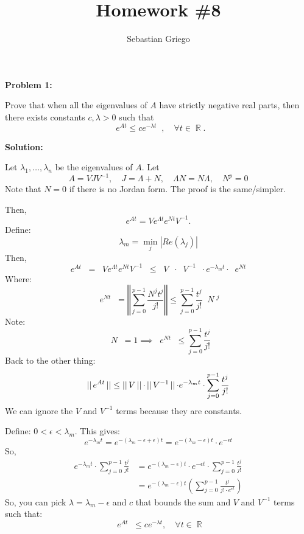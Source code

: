 \documentclass[12pt]{article}
\DeclareMathOperator{\norm}{||}
\DeclareMathOperator{\RR}{\mathbb{R}}
\newenvironment{problem}[1]{
    \textbf{Problem #1:}
}{
    \rmfamily \vspace{1em}
}
\newenvironment{solution}{
    \textbf{Solution:}
    
}{
    
    \vspace{2em}
}
\begin{document}
\title{Homework \#8}  %
\author{Sebastian Griego}  %
\maketitle


\begin{problem}{1}
    Prove that when all the eigenvalues of \(A\) have strictly negative real parts,
    then there exists constants \(c, \lambda > 0\) such that
    \[
        \norm{e^{At}} \leq c e^{-\lambda t} \norm, \quad \forall t \in \RR.
    \]
\end{problem}

\begin{solution}
    Let \(\lambda_1, \ldots, \lambda_n\) be the eigenvalues of \(A\). Let
    \[
        A = VJV^{-1}, \quad J = \Lambda + N, \quad \Lambda N = N\Lambda, \quad N^p=0
    \]
    Note that \(N = 0\) if there is no Jordan form. The proof is the same/simpler.

    Then,
    \[
        e^{At} = V e^{\Lambda t}e^{Nt} V^{-1}.
    \]
    Define:
    \[
        \lambda_m = \min_j |Re(\lambda_j)|
    \]
    Then,
    \[
        \norm{e^{At}}\norm = \norm{V e^{\Lambda t}e^{Nt} V^{-1}}\norm \leq \norm{V}\norm \cdot \norm V^{-1}\norm \cdot e^{-\lambda_m t} \cdot \norm{e^{Nt}}\norm
    \]
    Where:
    \[
        \norm{e^{Nt}}\norm = \left\Vert \sum_{j=0}^{p-1} \frac{N^j t^j}{j!} \right\Vert \leq \sum_{j=0}^{p-1} \frac{t^j}{j!} \norm N \norm^j
    \]
    Note:
    \[
        \norm N \norm = 1 \implies \norm{e^{Nt}}\norm \leq \sum_{j=0}^{p-1} \frac{t^j}{j!}
    \]
    Back to the other thing:
    \[
            \norm{e^{At}}\norm \leq \norm{V}\norm \cdot \norm V^{-1}\norm \cdot e^{-\lambda_m t} \cdot \sum_{j=0}^{p-1} \frac{t^j}{j!} \\
    \]
    We can ignore the \(V\) and \(V^{-1}\) terms because they are constants.

    Define: \(0 < \epsilon < \lambda_m\). This gives:
    \[
        e^{-\lambda_m t} = e^{-(\lambda_m - \epsilon + \epsilon)t} = e^{-(\lambda_m - \epsilon)t} \cdot e^{-\epsilon t}
    \]
    So,
    \[
        \begin{aligned}
            e^{-\lambda_m t} \cdot \sum_{j=0}^{p-1} \frac{t^j}{j!} &= e^{-(\lambda_m - \epsilon)t} \cdot e^{-\epsilon t} \cdot \sum_{j=0}^{p-1} \frac{t^j}{j!} \\
            &= e^{-(\lambda_m - \epsilon)t} \left( \sum_{j=0}^{p-1} \frac{t^j}{j! \cdot e^{\epsilon t}} \right)
        \end{aligned}
    \]
    So, you can pick \(\lambda = \lambda_m - \epsilon\) and \(c\) that bounds the sum and \(V\) and \(V^{-1}\) terms such that:
    \[
        \norm{e^{At}}\norm \leq c e^{-\lambda t}, \quad \forall t \in \RR
    \]
\end{solution}
\end{document}
